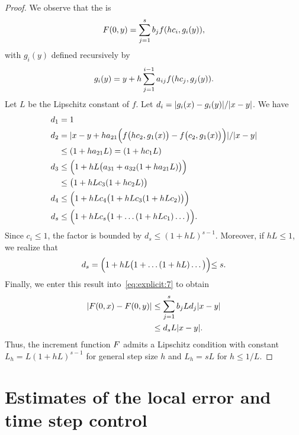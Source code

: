 \begin{proof}
  We observe that the  is
  \begin{gather}
    \label{eq:explicit:7}
    F(0, y) = \sum_{j=1}^s b_j f(hc_i, g_i(y)),
  \end{gather}
  with $g_i(y)$ defined recursively by
  \begin{gather*}
     g_i(y) = y + h \sum_{j=1}^{i-1} a_{ij} f(hc_j, g_j(y)).
  \end{gather*}
  Let $L$ be the Lipschitz constant of $f$. Let
  $d_i = \lvert g_i(x)-g_i(y)\rvert/\lvert x-y\rvert$. We have
  \begin{align*}
    d_1 &= 1
    \\
    d_2 &= \lvert x-y + h a_{21}
          \Bigl(f\bigl(hc_2,g_1(x)\bigr)
          -f\bigl(c_2,g_1(x)\bigr)
          \Bigr)\rvert/\lvert x-y\rvert
    \\ &\le (1+ha_{21}L)
         = (1+hc_{1}L)
    \\
    d_3 & \le \Bigl(1+
          h L\bigl(a_{31}+a_{32}(1+ha_{21}L)\bigr)\Bigr)
    \\ &\le \bigl(1+h L c_3(1+h c_2L)\bigr)
    \\
    d_4 & \le \Bigl(1+
          h L c_4\bigl(1+h L c_3(1+h L c_2)\bigr)\Bigr)
    \\
    d_s & \le
          \Bigl(1+ h L c_s\bigl(
          1+\dots(1+h L c_1)\dots\bigl)\Bigl).
  \end{align*}
  Since $c_i \le 1$, the factor is bounded by
  $d_s\le(1+h L)^{s-1}$. Moreover, if $h L \le 1$, we realize that
  \begin{gather*}
    d_s = \Bigl(1+ h L \bigl(1+\dots(1+h L)\dots\bigl)\Bigl) \le s.
  \end{gather*}
  Finally, we enter this result into~\eqref{eq:explicit:7} to obtain
  \begin{align*}
    \lvert F(0,x)-F(0,y)\rvert
    & \le \sum_{j=1}^s b_j L d_j \lvert x-y\rvert
    \\
    & \le d_s L \lvert x-y\rvert.
  \end{align*}
  Thus, the increment function $F$ admits a Lipschitz
  condition with constant $L_h = L(1+h L)^{s-1}$ for general step size
  $h$ and $L_h = s L$ for $h\le 1/L$.
\end{proof}

\section{Estimates of the local error
  and time step control}
  \label{section:step_size_control}

